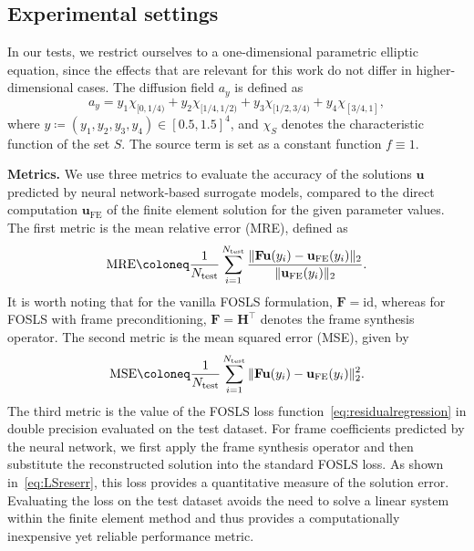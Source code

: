 \documentclass[a4paper,11pt]{amsart}
\numberwithin{equation}{section}
\theoremstyle{definition}
\theoremstyle{remark}
\theoremstyle{plain}
\begin{document}
\subsection{Experimental settings}\label{sec:exp}
In our tests, we restrict ourselves to a one-dimensional parametric elliptic equation, since the effects that are relevant for this work do not differ  in higher-dimensional cases. The diffusion field $a_{y}$ is defined as 
\begin{equation*}
a_{y}=y_{1}\chi_{[0,1/4)}+y_{2}\chi_{[1/4,1/2)}+y_{3}\chi_{[1/2,3/4)}+y_{4}\chi_{[3/4,1]},
\end{equation*}
where $y \coloneq (y_{1},y_{2},y_{3},y_{4}) \in[0.5, 1.5]^{4}$, and $\chi_S$ denotes the characteristic function of the set $S$. The source term is set as a constant function $f\equiv 1$.

\textbf{Metrics.}
We use three metrics to evaluate the accuracy of the solutions $\mathbf u$ predicted by neural network-based surrogate models, compared to the direct computation $\mathbf u_\mathrm{FE}$ of the finite element solution for the given parameter values. The first metric is the mean relative error (MRE), defined as
\begin{equation*}
\mathrm{MRE} \coloneq \frac{1}{N_{\rm test}}\sum_{i=1}^{N_{\rm test}}
\frac{\|\mathbf{F}\mathbf{u}(y_{i})-\mathbf{u}_{\rm FE}(y_{i})\|_{2}}
{\|\mathbf{u}_{\rm FE}(y_{i})\|_{2}}.
\end{equation*}
It is worth noting that for the vanilla FOSLS formulation, $\mathbf{F}=\mathrm{id}$, whereas for FOSLS with frame preconditioning, $\mathbf{F}=\mathbf{H}^{\intercal}$ denotes the frame synthesis operator. The second metric is the mean squared error (MSE), given by
\begin{equation*}
\mathrm{MSE} \coloneq \frac{1}{N_{\rm test}}\sum_{i=1}^{N_{\rm test}}
\|\mathbf{F}\mathbf{u}(y_{i})-\mathbf{u}_{\rm FE}(y_{i})\|_{2}^{2}.
\end{equation*}
The third metric is the value of the FOSLS loss function~\eqref{eq:residualregression} in double precision evaluated on the test dataset. For frame coefficients predicted by the neural network, we first apply the frame synthesis operator and then substitute the reconstructed solution into the standard FOSLS loss. As shown in~\eqref{eq:LSreserr}, this loss provides a quantitative measure of the solution error. Evaluating the loss on the test dataset avoids the need to solve a linear system within the finite element method and thus provides a computationally inexpensive yet reliable performance metric. 
\end{document}
